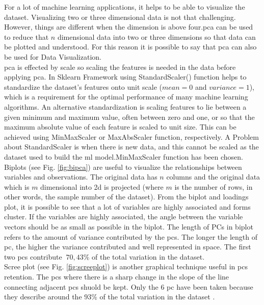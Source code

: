 \noindent For a lot of machine learning applications, it helps to be able to visualize the dataset. Visualizing two or three dimensional data is not that challenging. However, things are different when the dimension is above four.\gls{pca} can be used to reduce that $n$ dimensional data into two or three dimensions so that data can be plotted and understood. For this reason it is possible to say that \gls{pca} can also be used for Data Visualization. \\

\noindent \gls{pca} is effected by scale so scaling the features is needed in the data before applying \gls{pca}. In Sklearn Framework using StandardScaler() function helps to standardize the dataset’s features onto unit scale ($mean = 0$ and $variance = 1$), which is a requirement for the optimal performance of many machine learning algorithms. An alternative standardization is scaling features to lie between a given minimum and maximum value, often between zero and one, or so that the maximum absolute value of each feature is scaled to unit size. This can be achieved using MinMaxScaler or MaxAbsScaler function, respectively. A Problem about StandardScaler is when there is new data, and this cannot be scaled as the dataset used to build the \gls{ml} model.MinMaxScaler function has been chosen. \\

\noindent Biplots (see Fig. \ref{fig:bipca}) are useful to visualize the relationships between variables and observations. The original data has $n$ columns and the original data which is $m$ dimensional into \gls{2d} is projected (where $m$ is the number of rows, in other words, the sample number of the dataset). From the biplot and loadings plot, it is possible to see that a lot of variables are highly associated and forms cluster. If the variables are highly associated, the angle between the variable vectors should be as small as possible in the biplot. The length of PCs in biplot refers to the amount of variance contributed by the \glspl{pc}. The longer the length of \gls{pc}, the higher the variance contributed and well represented in space. The first two \glspl{pc} contribute $~70,43\%$ of the total variation in the dataset. \\

\noindent Scree plot (see Fig. \ref{fig:screeplot}) is another graphical technique useful in \glspl{pc} retention. The \glspl{pc} where there is a sharp change in the slope of the line connecting adjacent \glspl{pc} shuold be kept. Only the $6$ \gls{pc} have been taken because they describe around the $93\%$ of the total variation in the dataset .

